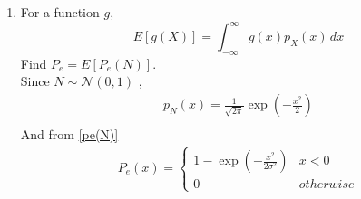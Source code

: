 \documentclass[10pt, a4paper]{article}
\providecommand{\sbrak}[1]{\ensuremath{{}\left[#1\right]}}
\providecommand{\brak}[1]{\ensuremath{\left(#1\right)}}
\begin{document}
\begin{enumerate}
%
\item
%
\label{ch4_anal}
For a function $g$,
\begin{equation}
E\sbrak{g(X)} = \int_{-\infty}^{\infty}g(x)p_{X}(x)\, dx
\end{equation}
%
Find $P_e = E\sbrak{P_e(N)}$.
\\
\solution
Since $N \sim \mathcal{N}(0,1)$ ,
\begin{align}
  p_N(x)= \frac{1}{\sqrt{2\pi}}\exp \brak{-\frac{x^2}{2} }\\
\end{align}
And from \eqref{pe(N)} 
\begin{align}
    P_e(x)=
    \begin{cases}
1-\exp\brak{{-\frac{x^2}{2\sigma^2}}} & x<0\\
0 & otherwise
\end{cases}
\end{align}


\end{enumerate}
\end{document}
